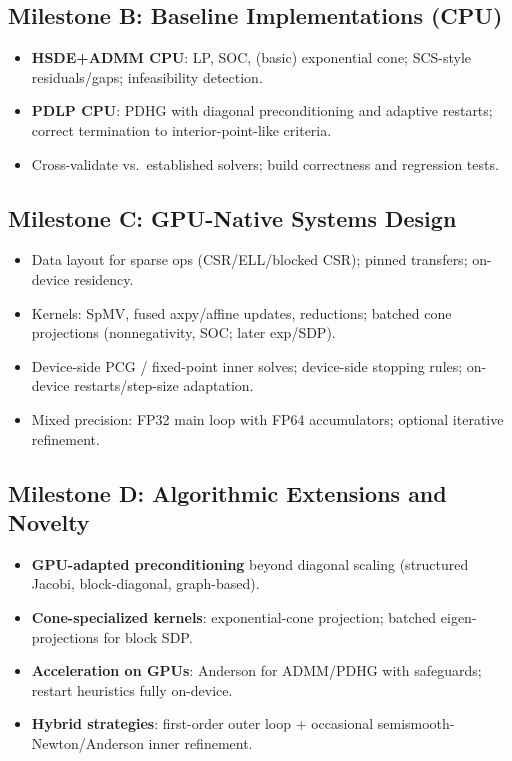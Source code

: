 \documentclass[12pt]{article}
\begin{document}
\subsection*{Milestone B: Baseline Implementations (CPU)}
\begin{itemize}
  \item \textbf{HSDE+ADMM CPU}: LP, SOC, (basic) exponential cone; SCS-style residuals/gaps; infeasibility detection.
  \item \textbf{PDLP CPU}: PDHG with diagonal preconditioning and adaptive restarts; correct termination to interior-point-like criteria.
  \item Cross-validate vs.\ established solvers; build correctness and regression tests.
\end{itemize}

\subsection*{Milestone C: GPU-Native Systems Design}
\begin{itemize}
  \item Data layout for sparse ops (CSR/ELL/blocked CSR); pinned transfers; on-device residency.
  \item Kernels: SpMV, fused axpy/affine updates, reductions; batched cone projections (nonnegativity, SOC; later exp/SDP).
  \item Device-side PCG / fixed-point inner solves; device-side stopping rules; on-device restarts/step-size adaptation.
  \item Mixed precision: FP32 main loop with FP64 accumulators; optional iterative refinement.
\end{itemize}

\subsection*{Milestone D: Algorithmic Extensions and Novelty}
\begin{itemize}
  \item \textbf{GPU-adapted preconditioning} beyond diagonal scaling (structured Jacobi, block-diagonal, graph-based).
  \item \textbf{Cone-specialized kernels}: exponential-cone projection; batched eigen-projections for block SDP.
  \item \textbf{Acceleration on GPUs}: Anderson for ADMM/PDHG with safeguards; restart heuristics fully on-device.
  \item \textbf{Hybrid strategies}: first-order outer loop + occasional semismooth-Newton/Anderson inner refinement.
\end{itemize}
\end{document}
